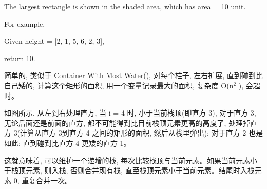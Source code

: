 \documentclass[12pt]{book}
\begin{document}
The largest rectangle is shown in the shaded area, which has area = 10 unit.

For example,

Given height = [2, 1, 5, 6, 2, 3],

return 10.

简单的, 类似于 Container With Most Water(), 对每个柱子, 左右扩展, 直到碰到比自己矮的, 计算这个矩形的面积, 用一个变量记录最大的面积, 复杂度 O(n$^{\text{2}}$ ), 会超时。

如图所示, 从左到右处理直方, 当 i = 4 时, 小于当前栈顶(即直方 3),  对于直方 3, 无论后面还是前面的直方, 都不可能得到比目前栈顶元素更高的高度了, 处理掉直方 3(计算从直方 3到直方 4 之间的矩形的面积, 然后从栈里弹出); 对于直方 2 也是如此; 直到碰到比直方 4 更矮的直方 1。

这就意味着, 可以维护一个递增的栈, 每次比较栈顶与当前元素。如果当前元素小于栈顶元素, 则入栈, 否则合并现有栈, 直至栈顶元素小于当前元素。结尾时入栈元素 0, 重复合并一次。
\end{document}
